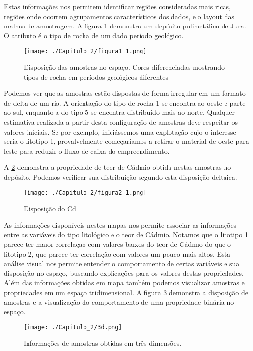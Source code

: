  Estas informações nos permitem identificar regiões consideradas mais ricas, regiões onde ocorrem agrupamentos característicos dos dados, e o layout das malhas de amostragem. A figura \ref{Fig1_1} demonstra um depósito polimetálico de Jura. O atributo é o tipo de rocha de um dado período geológico.  

\FloatBarrier
\begin{figure}[!htb]
\centering
\texttt{[image: ./Capitulo\_2/figura1\_1.png]}	
\caption{Disposição das amostras no espaço. Cores diferenciadas mostrando tipos de rocha em períodos geológicos diferentes}
\label{Fig1_1}
\end{figure}
\FloatBarrier

Podemos ver que as amostras estão dispostas de forma irregular em um formato de delta de um rio. A orientação do tipo de rocha 1 se encontra ao oeste e parte ao sul, enquanto a do tipo 5 se encontra distribuído mais ao norte. Qualquer estimativa realizada a partir desta configuração de amostras deve respeitar os valores iniciais. Se por exemplo, iniciássemos uma explotação cujo o interesse seria o litotipo 1, provalvelmente começaríamos a retirar o material de oeste para leste para reduzir o fluxo de caixa do empreendimento. 

A \ref{Fig2_1} demonstra a propriedade de teor de Cádmio obtida nestas amostras no depósito. Podemos verificar sua distribuição segundo esta disposição deltaica. 

\FloatBarrier
\begin{figure}[!htb]
\centering
\texttt{[image: ./Capitulo\_2/figura2\_1.png]}	
\caption{Disposição do Cd}
\label{Fig2_1}
\end{figure}
\FloatBarrier

As informações disponíveis nestes mapas nos permite associar as informações entre as variáveis do tipo litológico e o teor de Cádmio. Notamos que o litotipo 1 parece ter maior correlação com valores baixos do teor de Cádmio do que o litotipo 2, que parece ter correlação com valores um pouco mais altos. Esta análise visual nos permite entender o comportamento de certas variáveis e sua disposição no espaço, buscando explicações para os valores destas propriedades. Além das informações obtidas em mapa também podemos visualizar amostras e propriedades em um espaço tridimensional. A figura \ref{Fig_3d} demonstra a disposição de amostras e a visualização do comportamento de uma propriedade binária no espaço. 

\FloatBarrier
\begin{figure}[!htb]
	\centering
	\texttt{[image: ./Capitulo\_2/3d.png]}	
	\caption{Informações de amostras obtidas em três dimensões. }
	\label{Fig_3d}
\end{figure}
\FloatBarrier

